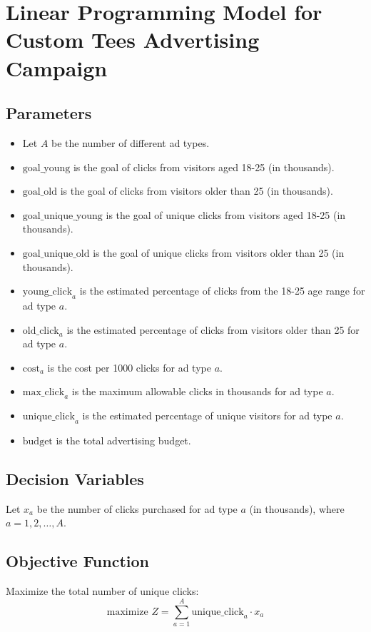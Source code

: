 \documentclass{article}
\begin{document}
\section*{Linear Programming Model for Custom Tees Advertising Campaign}

\subsection*{Parameters}
\begin{itemize}
    \item Let \( A \) be the number of different ad types.
    \item \( \text{goal\_young} \) is the goal of clicks from visitors aged 18-25 (in thousands).
    \item \( \text{goal\_old} \) is the goal of clicks from visitors older than 25 (in thousands).
    \item \( \text{goal\_unique\_young} \) is the goal of unique clicks from visitors aged 18-25 (in thousands).
    \item \( \text{goal\_unique\_old} \) is the goal of unique clicks from visitors older than 25 (in thousands).
    \item \( \text{young\_click}_{a} \) is the estimated percentage of clicks from the 18-25 age range for ad type \( a \).
    \item \( \text{old\_click}_{a} \) is the estimated percentage of clicks from visitors older than 25 for ad type \( a \).
    \item \( \text{cost}_{a} \) is the cost per 1000 clicks for ad type \( a \).
    \item \( \text{max\_click}_{a} \) is the maximum allowable clicks in thousands for ad type \( a \).
    \item \( \text{unique\_click}_{a} \) is the estimated percentage of unique visitors for ad type \( a \).
    \item \( \text{budget} \) is the total advertising budget.
\end{itemize}

\subsection*{Decision Variables}
Let \( x_{a} \) be the number of clicks purchased for ad type \( a \) (in thousands), where \( a = 1, 2, \ldots, A \).

\subsection*{Objective Function}
Maximize the total number of unique clicks:
\[
\text{maximize } Z = \sum_{a=1}^{A} \text{unique\_click}_{a} \cdot x_{a}
\]
\end{document}
